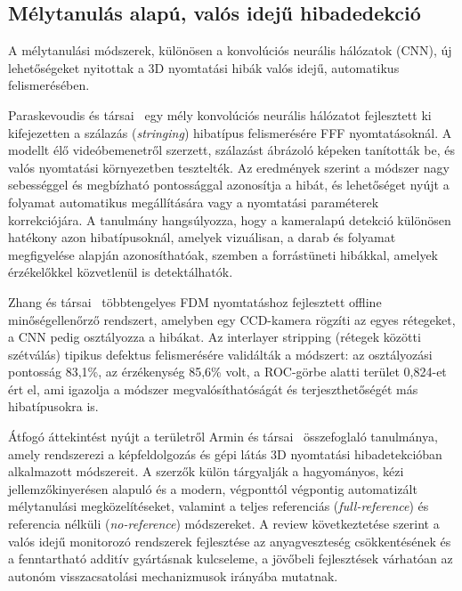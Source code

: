     \subsection{Mélytanulás alapú, valós idejű hibadedekció}

    A mélytanulási módszerek, különösen a konvolúciós neurális hálózatok (CNN), új lehetőségeket
    nyitottak a 3D nyomtatási hibák valós idejű, automatikus felismerésében.

    Paraskevoudis és társai~\cite{paraskevoudis2020stringing} egy mély konvolúciós neurális hálózatot
    fejlesztett ki kifejezetten a szálazás (\textit{stringing}) hibatípus felismerésére FFF
    nyomtatásoknál. A modellt élő videóbemenetről szerzett, szálazást ábrázoló képeken tanították be,
    és valós nyomtatási környezetben tesztelték. Az eredmények szerint a módszer nagy sebességgel
    és megbízható pontossággal azonosítja a hibát, és lehetőséget nyújt a folyamat automatikus
    megállítására vagy a nyomtatási paraméterek korrekciójára. A tanulmány hangsúlyozza, hogy
    a kameralapú detekció különösen hatékony azon hibatípusoknál, amelyek vizuálisan, a darab
    és folyamat megfigyelése alapján azonosíthatóak, szemben a forrástüneti hibákkal, amelyek
    érzékelőkkel közvetlenül is detektálhatók.

    Zhang és társai~\cite{zhang2023multiaxis} többtengelyes FDM nyomtatáshoz fejlesztett offline
    minőségellenőrző rendszert, amelyben egy CCD-kamera rögzíti az egyes rétegeket, a CNN pedig
    osztályozza a hibákat. Az interlayer stripping (rétegek közötti szétválás) tipikus defektus
    felismerésére validálták a módszert: az osztályozási pontosság 83,1\%, az érzékenység 85,6\%
    volt, a ROC-görbe alatti terület 0,824-et ért el, ami igazolja a módszer megvalósíthatóságát
    és terjeszthetőségét más hibatípusokra is.

    Átfogó áttekintést nyújt a területről Armin és társai~\cite{armin2025review} összefoglaló tanulmánya,
    amely rendszerezi a képfeldolgozás és gépi látás 3D nyomtatási hibadetekcióban alkalmazott
    módszereit. A szerzők külön tárgyalják a hagyományos, kézi jellemzőkinyerésen alapuló és a
    modern, végponttól végpontig automatizált mélytanulási megközelítéseket, valamint a
    teljes referenciás (\textit{full-reference}) és referencia nélküli (\textit{no-reference})
    módszereket. A review következtetése szerint a valós idejű monitorozó rendszerek fejlesztése
    az anyagveszteség csökkentésének és a fenntartható additív gyártásnak kulcseleme, a jövőbeli
    fejlesztések várhatóan az autonóm visszacsatolási mechanizmusok irányába mutatnak.

